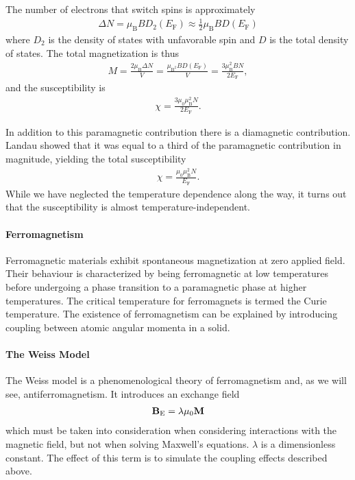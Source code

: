 The number of electrons that switch spins is approximately
\begin{align*}
	\Delta N = \mu_{\text{B}}BD_{2}(E_{\text{F}}) \approx \frac{1}{2}\mu_{\text{B}}BD(E_{\text{F}})
\end{align*}
where $D_{2}$ is the density of states with unfavorable spin and $D$ is the total density of states. The total magnetization is thus
\begin{align*}
	M = \frac{2\mu_{\text{B}}\Delta N}{V} = \frac{\mu_{\text{B}^{2}}BD(E_{\text{F}})}{V} = \frac{3\mu_{\text{B}}^{2}BN}{2E_{\text{F}}},
\end{align*}
and the susceptibility is
\begin{align*}
	\chi = \frac{3\mu_{0}\mu_{\text{B}}^{2}N}{2E_{\text{F}}}.
\end{align*}

In addition to this paramagnetic contribution there is a diamagnetic contribution. Landau showed that it was equal to a third of the paramagnetic contribution in magnitude, yielding the total susceptibility
\begin{align*}
	\chi = \frac{\mu_{0}\mu_{\text{B}}^{2}N}{E_{\text{F}}}.
\end{align*}
While we have neglected the temperature dependence along the way, it turns out that the susceptibility is almost temperature-independent.

\paragraph{Ferromagnetism}
Ferromagnetic materials exhibit spontaneous magnetization at zero applied field. Their behaviour is characterized by being ferromagnetic at low temperatures before undergoing a phase transition to a paramagnetic phase at higher temperatures. The critical temperature for ferromagnets is termed the Curie temperature. The existence of ferromagnetism can be explained by introducing coupling between atomic angular momenta in a solid.

\paragraph{The Weiss Model}
The Weiss model is a phenomenological theory of ferromagnetism and, as we will see, antiferromagnetism. It introduces an exchange field
\begin{align*}
	\vb{B}_{\text{E}} = \lambda\mu_{0}\vb{M}
\end{align*}
which must be taken into consideration when considering interactions with the magnetic field, but not when solving Maxwell's equations. $\lambda$ is a dimensionless constant. The effect of this term is to simulate the coupling effects described above.

